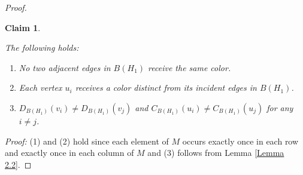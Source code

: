 \documentclass[10pt,a4paper]{amsart}
\newtheorem{claim}{Claim}
\begin{document}
\begin{proof}
\begin{claim}\label{Claim 8}
{\em The following holds:
\begin{enumerate}
    \item No two adjacent edges in $B(H_1)$ receive the same color. 
    \item Each vertex $u_i$ receives a color distinct from its incident edges in $B(H_1)$. 
    \item %
    $D_{B(H_1)}(v_i)\neq D_{B(H_1)}(v_j)$
    and
    $C_{B(H_1)}(u_i)\neq C_{B(H_1)}(u_j)$ for any  $i\neq j$.
\end{enumerate}
}
\end{claim}

\textit{Proof:}
(1) and (2) hold since each element of $M$
occurs exactly once in each row and exactly once in each column of $M$ and (3) follows from Lemma \ref{Lemma 2.2}.


\end{proof}
\end{document}
